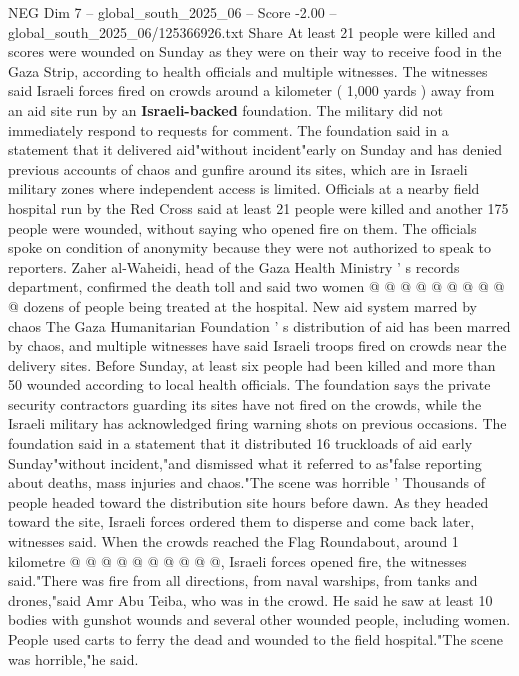 \begin{textsample}{NEG Dim 7 – global\_south\_2025\_06 – Score -2.00 – global\_south\_2025\_06/125366926.txt}  \label{ex:f7_neg_052}
Share At least 21 people were killed and scores were wounded on Sunday as they were on their way to receive food in the Gaza Strip, according to health officials and multiple witnesses.
The witnesses said Israeli forces fired on crowds around a kilometer ( 1,000 yards ) away from an aid site run by an \textbf{Israeli-backed} foundation.
The military did not immediately respond to requests for comment.
The foundation said in a statement that it delivered aid"without incident"early on Sunday and has denied previous accounts of chaos and gunfire around its sites, which are in Israeli military zones where independent access is limited.
Officials at a nearby field hospital run by the Red Cross said at least 21 people were killed and another 175 people were wounded, without saying who opened fire on them.
The officials spoke on condition of anonymity because they were not authorized to speak to reporters.
Zaher al-Waheidi, head of the Gaza Health Ministry ' s records department, confirmed the death toll and said two women @ @ @ @ @ @ @ @ @ @ dozens of people being treated at the hospital.
New aid system marred by chaos The Gaza Humanitarian Foundation ' s distribution of aid has been marred by chaos, and multiple witnesses have said Israeli troops fired on crowds near the delivery sites.
Before Sunday, at least six people had been killed and more than 50 wounded according to local health officials.
The foundation says the private security contractors guarding its sites have not fired on the crowds, while the Israeli military has acknowledged firing warning shots on previous occasions.
The foundation said in a statement that it distributed 16 truckloads of aid early Sunday"without incident,"and dismissed what it referred to as"false reporting about deaths, mass injuries and chaos."The scene was horrible ' Thousands of people headed toward the distribution site hours before dawn.
As they headed toward the site, Israeli forces ordered them to disperse and come back later, witnesses said.
When the crowds reached the Flag Roundabout, around 1 kilometre @ @ @ @ @ @ @ @ @ @, Israeli forces opened fire, the witnesses said."There was fire from all directions, from naval warships, from tanks and drones,"said Amr Abu Teiba, who was in the crowd.
He said he saw at least 10 bodies with gunshot wounds and several other wounded people, including women.
People used carts to ferry the dead and wounded to the field hospital."The scene was horrible,"he said.

\end{textsample}

